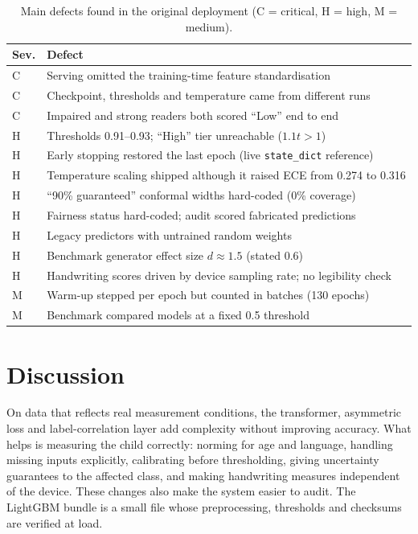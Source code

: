 \documentclass[conference]{IEEEtran}
\begin{document}
\begin{table}[!t]
\centering
\caption{Main defects found in the original deployment (C = critical, H = high, M = medium).}
\label{tab:defects}
\footnotesize
\setlength{\tabcolsep}{3pt}
\begin{tabular}{@{}lp{7.0cm}@{}}
\toprule
Sev. & Defect \\
\midrule
C & Serving omitted the training-time feature standardisation \\
C & Checkpoint, thresholds and temperature came from different runs \\
C & Impaired and strong readers both scored ``Low'' end to end \\
H & Thresholds 0.91--0.93; ``High'' tier unreachable ($1.1t>1$) \\
H & Early stopping restored the last epoch (live \texttt{state\_dict} reference) \\
H & Temperature scaling shipped although it raised ECE from 0.274 to 0.316 \\
H & ``90\% guaranteed'' conformal widths hard-coded (0\% coverage) \\
H & Fairness status hard-coded; audit scored fabricated predictions \\
H & Legacy predictors with untrained random weights \\
H & Benchmark generator effect size $d\approx1.5$ (stated 0.6) \\
H & Handwriting scores driven by device sampling rate; no legibility check \\
M & Warm-up stepped per epoch but counted in batches (130 epochs) \\
M & Benchmark compared models at a fixed 0.5 threshold \\
\bottomrule
\end{tabular}
\end{table}

\section{Discussion}
On data that reflects real measurement conditions, the transformer, asymmetric loss
and label-correlation layer add complexity without improving accuracy. What helps is
measuring the child correctly: norming for age and language, handling missing inputs
explicitly, calibrating before thresholding, giving uncertainty guarantees to the
affected class, and making handwriting measures independent of the device. These
changes also make the system easier to audit. The LightGBM bundle is a small file
whose preprocessing, thresholds and checksums are verified at load.
\end{document}
